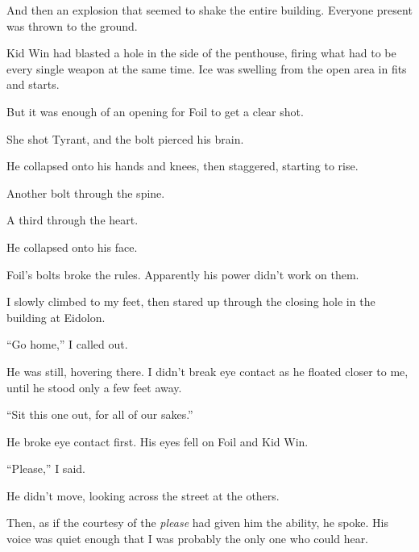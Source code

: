 And then an explosion that seemed to shake the entire building.  Everyone present was thrown to the ground.



Kid Win had blasted a hole in the side of the penthouse, firing what had to be every single weapon at the same time.  Ice was swelling from the open area in fits and starts.



But it was enough of an opening for Foil to get a clear shot.



She shot Tyrant, and the bolt pierced his brain.



He collapsed onto his hands and knees, then staggered, starting to rise.



Another bolt through the spine.



A third through the heart.



He collapsed onto his face.



Foil's bolts broke the rules.  Apparently his power didn't work on them.



I slowly climbed to my feet, then stared up through the closing hole in the building at Eidolon.



``Go home,'' I called out.



He was still, hovering there.  I didn't break eye contact as he floated closer to me, until he stood only a few feet away.



``Sit this one out, for all of our sakes.''



He broke eye contact first.  His eyes fell on Foil and Kid Win.



``Please,'' I said.



He didn't move, looking across the street at the others.



Then, as if the courtesy of the \emph{please} had given him the ability, he spoke.  His voice was quiet enough that I was probably the only one who could hear.



